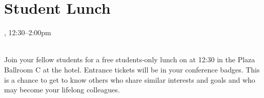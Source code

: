 \clearpage
\section{Student Lunch}
\setheaders{}{\daydateyear}

\begin{center}



\daydateyear, 12:30--2:00pm \vspace{1em}\\
\StudentLunchLoc \\
\end{center}

Join your fellow students for a free students-only lunch on \daydate
at 12:30 in the Plaza Ballroom C at the hotel.  Entrance tickets will
be in your conference badges. This is a chance to get to know others
who share similar interests and goals and who may become your lifelong
colleagues.
